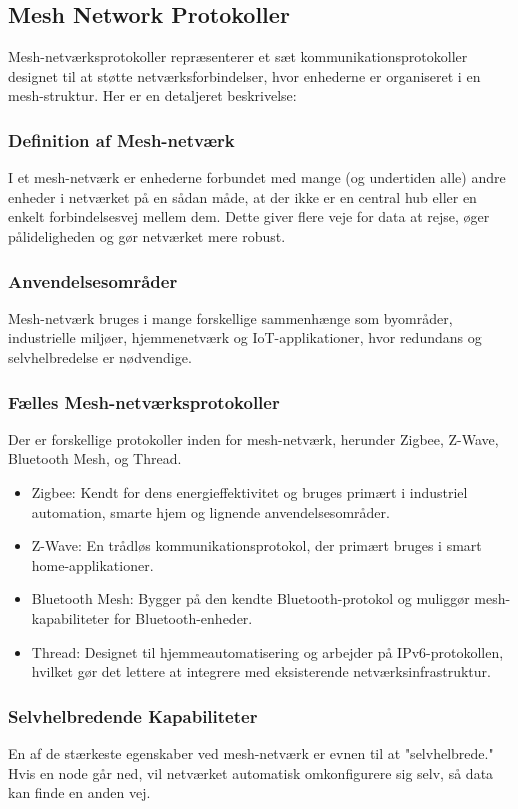 \subsection{Mesh Network Protokoller}
Mesh-netværksprotokoller repræsenterer et sæt kommunikationsprotokoller designet til at støtte netværksforbindelser, hvor enhederne er organiseret i en mesh-struktur. Her er en detaljeret beskrivelse:
\subsubsection{Definition af Mesh-netværk}
I et mesh-netværk er enhederne forbundet med mange (og undertiden alle) andre enheder i netværket på en sådan måde, at der ikke er en central hub eller en enkelt forbindelsesvej mellem dem. Dette giver flere veje for data at rejse, øger pålideligheden og gør netværket mere robust.
\subsubsection{Anvendelsesområder}
Mesh-netværk bruges i mange forskellige sammenhænge som byområder, industrielle miljøer, hjemmenetværk og IoT-applikationer, hvor redundans og selvhelbredelse er nødvendige.
\subsubsection{Fælles Mesh-netværksprotokoller}
Der er forskellige protokoller inden for mesh-netværk, herunder Zigbee, Z-Wave, Bluetooth Mesh, og Thread.
\begin{itemize}
	\item Zigbee: Kendt for dens energieffektivitet og bruges primært i industriel automation, smarte hjem og lignende anvendelsesområder.
	\item Z-Wave: En trådløs kommunikationsprotokol, der primært bruges i smart home-applikationer.
	\item Bluetooth Mesh: Bygger på den kendte Bluetooth-protokol og muliggør mesh-kapabiliteter for Bluetooth-enheder.
	\item Thread: Designet til hjemmeautomatisering og arbejder på IPv6-protokollen, hvilket gør det lettere at integrere med eksisterende netværksinfrastruktur.
\end{itemize}
\subsubsection{Selvhelbredende Kapabiliteter}
En af de stærkeste egenskaber ved mesh-netværk er evnen til at "selvhelbrede." Hvis en node går ned, vil netværket automatisk omkonfigurere sig selv, så data kan finde en anden vej.
